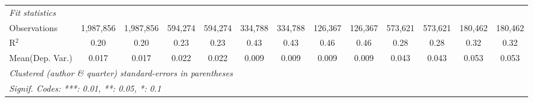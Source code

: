 \begin{tabular}{lcccccccccccc}
   \midrule
   \emph{Fit statistics}\\
   Observations                             & 1,987,856     & 1,987,856      & 594,274       & 594,274        & 334,788       & 334,788      & 126,367 & 126,367       & 573,621       & 573,621        & 180,462       & 180,462\\  
   R$^2$                                    & 0.20          & 0.20           & 0.23          & 0.23           & 0.43          & 0.43         & 0.46    & 0.46          & 0.28          & 0.28           & 0.32          & 0.32\\  
Mean(Dep. Var.) & 0.017 & 0.017 & 0.022 & 0.022 & 0.009 & 0.009 & 0.009 & 0.009 & 0.043 & 0.043 & 0.053 & 0.053 \\
   \midrule \midrule
   \multicolumn{13}{l}{\emph{Clustered (author \& quarter) standard-errors in parentheses}}\\
   \multicolumn{13}{l}{\emph{Signif. Codes: ***: 0.01, **: 0.05, *: 0.1}}\\
\end{tabular}
\par\endgroup
